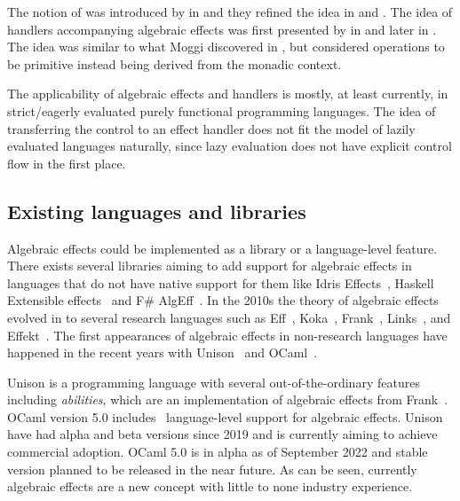 The notion of  was introduced by \textcite{adequacy-for-alg-effs} in \citeyear{adequacy-for-alg-effs} and they refined the idea in \cite{comp-effs-and-ops} and \cite{alg-ops-gen-effs}. The idea of handlers accompanying algebraic effects was first presented by \textcite{handlers-of-alg-effs} in \citeyear{handlers-of-alg-effs} and later \textcite{handling-alg-effs} in \citeyear{handling-alg-effs}. The idea was similar to what Moggi discovered in \cite{notions-computations}, but \citeauthor{adequacy-for-alg-effs} considered operations to be primitive instead being derived from the monadic context. 

The applicability of algebraic effects and handlers is mostly, at least currently, in strict/eagerly evaluated purely functional programming languages. The idea of transferring the control to an effect handler does not fit the model of lazily evaluated languages naturally, since lazy evaluation does not have explicit control flow in the first place.~\cite{alg-effs-for-fp}

\subsection{Existing languages and libraries}
Algebraic effects could be implemented as a library or a language-level feature. There exists several libraries aiming to add support for algebraic effects in languages that do not have native support for them like Idris Effects~\cite{idris-effects}, Haskell Extensible effects~\cite{extensible-effects} and F\# AlgEff~\cite{fsharp-alg-eff}. In the 2010s the theory of algebraic effects evolved in to several research languages such as Eff~\cite{eff-lang}, Koka~\cite{koka-lang}, Frank~\cite{frank-lang}, Links~\cite{links-lang}, and Effekt~\cite{effekt-lang}. The first appearances of algebraic effects in non-research languages have happened in the recent years with Unison~\cite{unison-lang} and OCaml~\cite{ocaml-lang}.

Unison is a programming language with several out-of-the-ordinary features including \textit{abilities}, which are an implementation of algebraic effects from Frank~\cite{frank-lang}. OCaml version 5.0 includes~\cite{ocaml-mc-sep-2021} language-level support for algebraic effects. Unison have had alpha and beta versions since 2019 and is currently aiming to achieve commercial adoption. OCaml 5.0 is in alpha as of September 2022 and stable version planned to be released in the near future. As can be seen, currently algebraic effects are a new concept with little to none industry experience.

